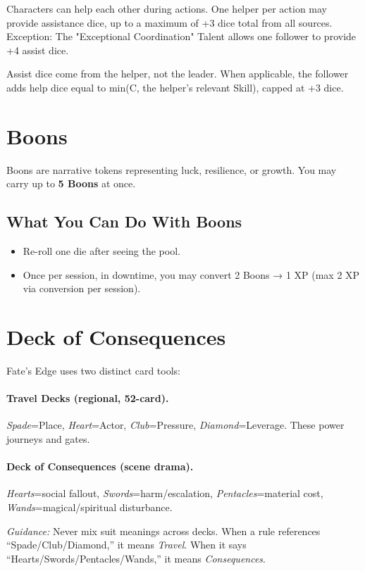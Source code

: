 Characters can help each other during actions. One helper per action may provide assistance dice, up to a maximum of +3 dice total from all sources. Exception: The "Exceptional Coordination" Talent allows one follower to provide +4 assist dice.

Assist dice come from the helper, not the leader. When applicable, the follower adds help dice equal to min(C, the helper's relevant Skill), capped at +3 dice.

\section{Boons}

Boons are narrative tokens representing luck, resilience, or growth. You may carry up to \textbf{5 Boons} at once.

\subsection*{What You Can Do With Boons}

\begin{itemize}
  \item Re-roll one die after seeing the pool.
  \item Once per session, in downtime, you may convert 2 Boons → 1 XP (max 2 XP via conversion per session).
\end{itemize}

\section{Deck of Consequences}

Fate's Edge uses two distinct card tools:

\paragraph{Travel Decks (regional, 52-card).}
\emph{Spade}=Place, \emph{Heart}=Actor, \emph{Club}=Pressure, \emph{Diamond}=Leverage. These power journeys and gates.

\paragraph{Deck of Consequences (scene drama).}
\emph{Hearts}=social fallout, \emph{Swords}=harm/escalation, \emph{Pentacles}=material cost, \emph{Wands}=magical/spiritual disturbance.

\textit{Guidance:} Never mix suit meanings across decks. When a rule references ``Spade/Club/Diamond,'' it means \emph{Travel}. When it says ``Hearts/Swords/Pentacles/Wands,'' it means \emph{Consequences}.

